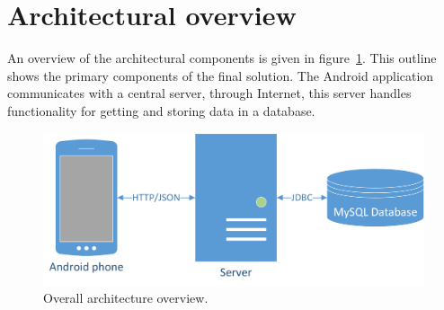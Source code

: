 \section{Architectural overview}
An overview of the architectural components is given in figure~\ref{fig:architecture}. This outline shows the primary components of the final solution. The Android application communicates with a central server, through Internet, this server handles functionality for getting and storing data in a database.

\begin{figure}[H]
\includegraphics[width=\textwidth]{ch/architecture/fig/arch.png}
\caption{Overall architecture overview.}
\label{fig:architecture}
\end{figure}